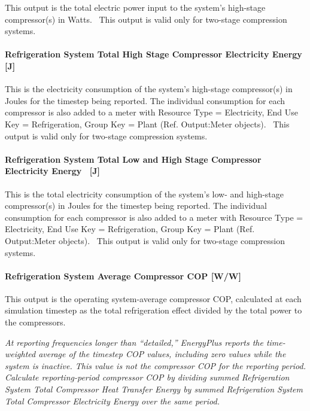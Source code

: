 This output is the total electric power input to the system's high-stage compressor(s) in Watts.~ This output is valid only for two-stage compression systems.

\paragraph{Refrigeration System Total High Stage Compressor Electricity Energy {[}J{]}}\label{refrigeration-system-total-high-stage-compressor-electric-energy-j}

This is the electricity consumption of the system's high-stage compressor(s) in Joules for the timestep being reported. The individual consumption for each compressor is also added to a meter with Resource Type = Electricity, End Use Key = Refrigeration, Group Key = Plant (Ref. Output:Meter objects).~ This output is valid only for two-stage compression systems.

\paragraph{Refrigeration System Total Low and High Stage Compressor Electricity Energy~ {[}J{]}}\label{refrigeration-system-total-low-and-high-stage-compressor-electric-energy-j}

This is the total electricity consumption of the system's low- and high-stage compressor(s) in Joules for the timestep being reported. The individual consumption for each compressor is also added to a meter with Resource Type = Electricity, End Use Key = Refrigeration, Group Key = Plant (Ref. Output:Meter objects).~ This output is valid only for two-stage compression systems.

\paragraph{Refrigeration System Average Compressor COP {[}W/W{]}}\label{refrigeration-system-average-compressor-cop-ww}

This output is the operating system-average compressor COP, calculated at each simulation timestep as the total refrigeration effect divided by the total power to the compressors.

\emph{At reporting frequencies longer than ``detailed,'' EnergyPlus reports the time-weighted average of the timestep COP values, including zero values while the system is inactive. This value is not the compressor COP for the reporting period. Calculate reporting-period compressor COP by dividing summed Refrigeration System Total Compressor Heat Transfer Energy by summed Refrigeration System Total Compressor Electricity Energy over the same period.}


